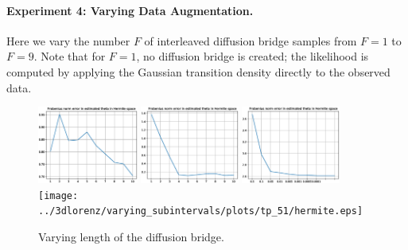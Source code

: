 \documentclass{article}
\begin{document}
\paragraph{Experiment 4: Varying Data Augmentation.} 
Here we vary the number $F$ of interleaved diffusion bridge samples from $F=1$ to $F=9$.  Note that for $F=1$, no diffusion bridge is created; the likelihood is computed by applying the Gaussian transition density directly to the observed data.
\begin{figure}[th]
\includegraphics[height=1in]{../1dcode/varying_subintervals/plots/tp_51/hermite.eps}
\includegraphics[height=1in]{../2dcode/varying_subintervals/plots/tp_51/hermite.eps}
\includegraphics[height=1in]{../3ddampedduffing/varying_subintervals/plots/tp_51/hermite.eps}
\texttt{[image: ../3dlorenz/varying\_subintervals/plots/tp\_51/hermite.eps]}
\caption{Varying length of the diffusion bridge.}
\label{fig:exp2}
\end{figure}

{\small


}
\end{document}
